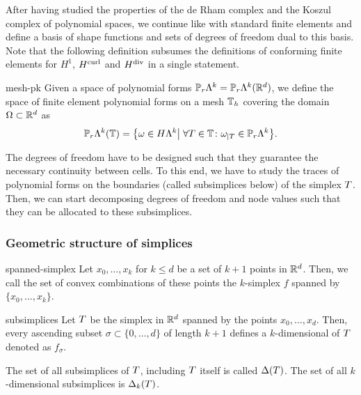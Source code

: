 \begin{intro}
  After having studied the properties of the de Rham complex and the
  Koszul complex of polynomial spaces, we continue like with standard
  finite elements and define a basis of shape functions and sets of
  degrees of freedom dual to this basis. Note that the following
  definition subsumes the definitions of conforming finite elements
  for $H^1$, $H^{\text{curl}}$ and $H^{\text{div}}$ in a single statement.
\end{intro}

\begin{Definition}{mesh-pk}
  Given a space of polynomial forms
  $\mathbb P_r\Lambda^k=\mathbb P_r\Lambda^k(\mathbb R^d)$, we define the space of finite
  element polynomial forms on a mesh $\mathbb T_h$ covering the domain
  $\Omega\subset\mathbb R^d$ as
  \begin{gather}
    \mathbb P_r\Lambda^k(\mathbb T) = \bigl\{
    \omega \in H\Lambda^k \big|
    \;\forall T\in\mathbb T\colon \omega_{|T} \in \mathbb P_r\Lambda^k
    \bigr\}.
  \end{gather}
\end{Definition}

\begin{intro}
  The degrees of freedom have to be designed such that they guarantee
  the necessary continuity between cells. To this end, we have to
  study the traces of polynomial forms on the boundaries (called
  subsimplices below) of the simplex $T$. Then, we can start
  decomposing degrees of freedom and node values such that they can be
  allocated to these subsimplices.
\end{intro}

\subsubsection{Geometric structure of simplices}

\begin{Definition}{spanned-simplex}
  Let $x_0,\dots,x_k$ for $k\le d$ be a set of $k+1$ points in
  $\mathbb R^d$. Then, we call the set of convex combinations of these points
  the $k$-simplex $f$ spanned by $\{x_0,\dots,x_k\}$.
\end{Definition}


\begin{Definition}{subsimplices}
  Let $T$ be the simplex in $\mathbb R^d$ spanned by the points
  $x_0,\dots,x_d$. Then, every ascending subset
  $\sigma \subset \{0,\dots,d\}$ of length $k+1$ defines a
  $k$-dimensional  of $T$ denoted as $f_\sigma$.

  The set of all subsimplices of $T$, including $T$ itself is
  called $\Delta(T)$. The set of all $k$-dimensional subsimplices
  is $\Delta_k(T)$.
\end{Definition}

